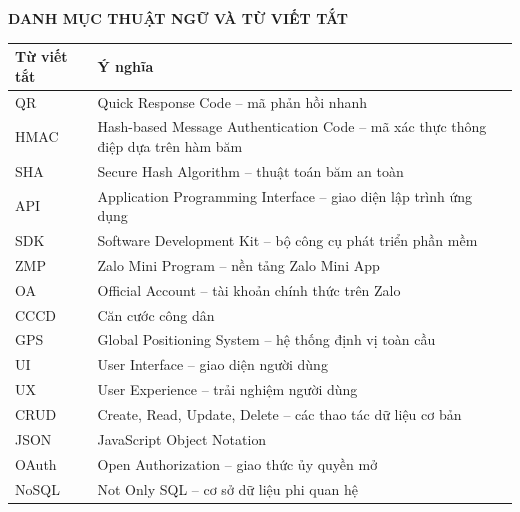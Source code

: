 \newpage
\thispagestyle{empty}
\begin{center}
    {\Large \textbf{DANH MỤC THUẬT NGỮ VÀ TỪ VIẾT TẮT}}
\end{center}
\vspace{0.5cm}

\renewcommand{\arraystretch}{1.4}
\noindent
\begin{tabularx}{\linewidth}{|>{\centering\arraybackslash}m{3cm}|X|}
\hline
\textbf{Từ viết tắt} & \textbf{Ý nghĩa} \\ \hline
QR    & Quick Response Code -- mã phản hồi nhanh \\ \hline
HMAC  & Hash-based Message Authentication Code -- mã xác thực thông điệp dựa trên hàm băm \\ \hline
SHA   & Secure Hash Algorithm -- thuật toán băm an toàn \\ \hline
API   & Application Programming Interface -- giao diện lập trình ứng dụng \\ \hline
SDK   & Software Development Kit -- bộ công cụ phát triển phần mềm \\ \hline
ZMP   & Zalo Mini Program -- nền tảng Zalo Mini App \\ \hline
OA    & Official Account -- tài khoản chính thức trên Zalo \\ \hline
CCCD  & Căn cước công dân \\ \hline
GPS   & Global Positioning System -- hệ thống định vị toàn cầu \\ \hline
UI    & User Interface -- giao diện người dùng \\ \hline
UX    & User Experience -- trải nghiệm người dùng \\ \hline
CRUD  & Create, Read, Update, Delete -- các thao tác dữ liệu cơ bản \\ \hline
JSON  & JavaScript Object Notation \\ \hline
OAuth & Open Authorization -- giao thức ủy quyền mở \\ \hline
NoSQL & Not Only SQL -- cơ sở dữ liệu phi quan hệ \\ \hline
\end{tabularx}
